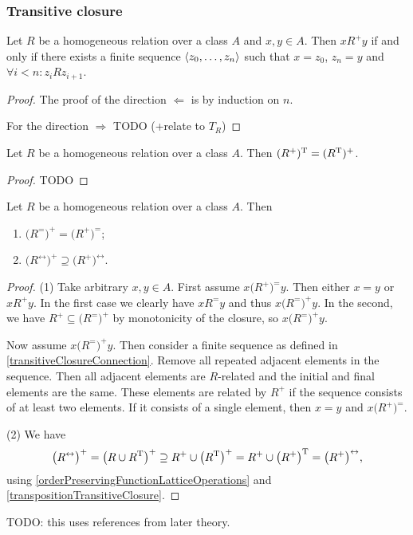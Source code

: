 \subsubsection{Transitive closure}

\begin{proposition} \label{transitiveClosureConnection}
Let $R$ be a homogeneous relation over a class $A$ and $x,y\in A$. Then $x\mathrel{R^+}y$ \textup{if and only if} there exists a finite sequence $\left\langle z_0, \ldots, z_n \right\rangle$ such that $x=z_0$, $z_n=y$ and $\forall i<n: z_iRz_{i+1}$.
\end{proposition}
\begin{proof}
The proof of the direction $\Leftarrow$ is by induction on $n$.

For the direction $\Rightarrow$ TODO (+relate to $T_R$)
\end{proof}

\begin{lemma} \label{transpositionTransitiveClosure}
Let $R$ be a homogeneous relation over a class $A$. Then $(R^+)^{\mathrm{T}} = (R^{\mathrm{T}})^+$.
\end{lemma}
\begin{proof}
TODO
\end{proof}

\begin{proposition}
Let $R$ be a homogeneous relation over a class $A$. Then
\begin{enumerate}
\item $\big(R^=\big)^+ = \big(R^+\big)^=$;
\item $\big(R^\leftrightarrow\big)^+ \supseteq \big(R^+\big)^\leftrightarrow$.
\end{enumerate}
\end{proposition}
\begin{proof}
(1) Take arbitrary $x,y\in A$. First assume $x\mathrel{\big(R^+\big)^=}y$. Then either $x=y$ or $x\mathrel{R^+}y$. In the first case we clearly have $x\mathrel{R^=}y$ and thus $x\mathrel{\big(R^=\big)^+}y$. In the second, we have $R^+ \subseteq \big(R^=\big)^+$ by monotonicity of the closure, so $x\mathrel{\big(R^=\big)^+}y$.

Now assume $x\mathrel{\big(R^=\big)^+}y$. Then consider a finite sequence as defined in \ref{transitiveClosureConnection}. Remove all repeated adjacent elements in the sequence. Then all adjacent elements are $R$-related and the initial and final elements are the same. These elements are related by $R^+$ if the sequence consists of at least two elements. If it consists of a single element, then $x=y$ and $x\mathrel{\big(R^+\big)^=}$.

(2) We have
\[ \big(R^\leftrightarrow\big)^+ = \big(R\cup R^{\mathrm{T}}\big)^+ \supseteq R^+ \cup \big(R^{\mathrm{T}}\big)^+ = R^+ \cup \big(R^+\big)^{\mathrm{T}} = \big(R^+\big)^\leftrightarrow, \]
using \ref{orderPreservingFunctionLatticeOperations} and \ref{transpositionTransitiveClosure}.
\end{proof}
TODO: this uses references from later theory.

